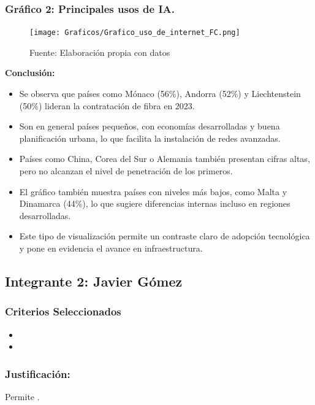 \documentclass[12pt, a4paper]{article}
\begin{document}
\subsubsection*{Gráfico 2: Principales usos de IA.}
\begin{figure}[H]
    \centering
    \texttt{[image: Graficos/Grafico\_uso\_de\_internet\_FC.png]}
    \caption[2]{Fuente: Elaboración propia con datos}
\end{figure}

\textbf{Conclusión:}
\begin{itemize}
    \item Se observa que países como Mónaco (56\%), Andorra (52\%) y Liechtenstein (50\%) lideran la contratación de fibra en 2023.
    \item Son en general países pequeños, con economías desarrolladas y buena planificación urbana, lo que facilita la instalación de redes avanzadas.
    \item Países como China, Corea del Sur o Alemania también presentan cifras altas, pero no alcanzan el nivel de penetración de los primeros.
    \item El gráfico también muestra países con niveles más bajos, como Malta y Dinamarca (44\%), lo que sugiere diferencias internas incluso en regiones desarrolladas.
    \item Este tipo de visualización permite un contraste claro de adopción tecnológica y pone en evidencia el avance en infraestructura.
\end{itemize}


\newpage
\subsection*{Integrante 2: Javier Gómez}

\subsubsection*{Criterios Seleccionados}
\begin{itemize}
    \item 
    \item 
\end{itemize}

\subsubsection*{Justificación: }
Permite .
\end{document}
